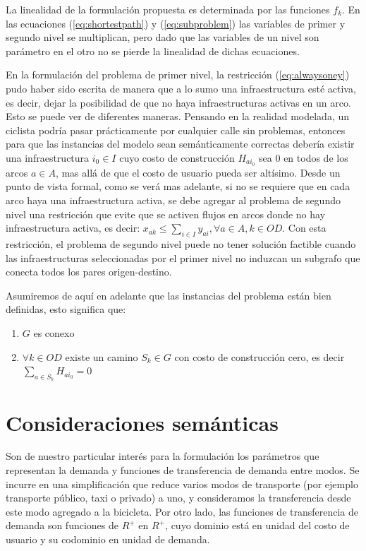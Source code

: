 \documentclass{article}
\begin{document}
  La linealidad de la formulación propuesta es determinada por las funciones $f_k$. En las ecuaciones (\ref{eq:shortestpath}) y (\ref{eq:subproblem}) las variables de primer y segundo nivel se multiplican, pero dado que las variables de un nivel son parámetro en el otro no se pierde la linealidad de dichas ecuaciones.

  En la formulación del problema de primer nivel, la restricción (\ref{eq:alwaysoney}) pudo haber sido escrita de manera que a lo sumo una infraestructura esté activa, es decir, dejar la posibilidad de que no haya infraestructuras activas en un arco. Esto se puede ver de diferentes maneras. Pensando en la realidad modelada, un ciclista podría pasar prácticamente por cualquier calle sin problemas, entonces para que las instancias del modelo sean semánticamente correctas debería existir una infraestructura $i_0 \in I$ cuyo costo de construcción $H_{ai_0}$ sea 0 en todos de los arcos $a \in A$, mas allá de que el costo de usuario pueda ser altísimo. Desde un punto de vista formal, como se verá mas adelante, si no se requiere que en cada arco haya una infraestructura activa, se debe agregar al problema de segundo nivel una restricción que evite que se activen flujos en arcos donde no hay infraestructura activa, es decir: $x_{ak} \leq \sum_{i \in I} y_{ai}, \forall a \in A, k \in OD$. Con esta restricción, el problema de segundo nivel puede no tener solución factible cuando las infraestructuras seleccionadas por el primer nivel no induzcan un subgrafo que conecta todos los pares origen-destino.

  Asumiremos de aquí en adelante que las instancias del problema están bien definidas, esto significa que:

  \begin{enumerate}
    \item {$G$ es conexo}
    \item {$\forall k \in OD$ existe un camino $S_k \in G$ con costo de construcción cero, es decir $\sum_{a \in S_k} H_{ai_0} = 0$}
  \end{enumerate}

  \section{Consideraciones semánticas}

  Son de nuestro particular interés para la formulación los parámetros que representan la demanda y funciones de transferencia de demanda entre modos. Se incurre en una simplificación que reduce varios modos de transporte (por ejemplo transporte público, taxi o privado) a uno, y consideramos la transferencia desde este modo agregado a la bicicleta. Por otro lado, las funciones de transferencia de demanda son funciones de $R^+$ en $R^+$, cuyo dominio está en unidad del costo de usuario y su codominio en unidad de demanda.
\end{document}
